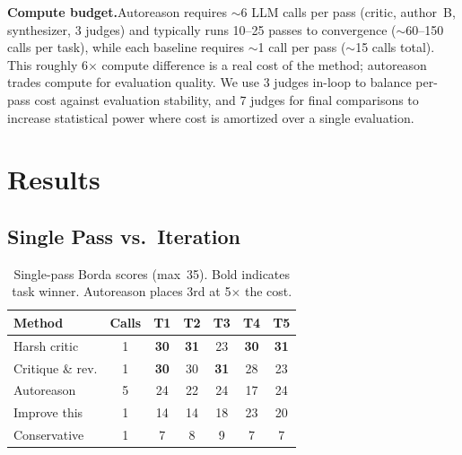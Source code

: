 \documentclass[10pt,twocolumn]{article}
\begin{document}
\textbf{Compute budget.}\enspace Autoreason requires ${\sim}$6 LLM calls per pass (critic, author~B, synthesizer, 3 judges) and typically runs 10--25 passes to convergence (${\sim}$60--150 calls per task), while each baseline requires ${\sim}$1 call per pass (${\sim}$15 calls total). This roughly 6$\times$ compute difference is a real cost of the method; autoreason trades compute for evaluation quality. We use 3 judges in-loop to balance per-pass cost against evaluation stability, and 7 judges for final comparisons to increase statistical power where cost is amortized over a single evaluation.

\section{Results}

\subsection{Single Pass vs.\ Iteration}
\label{sec:v1}

\begin{table}[H]
\centering
\small
\begin{tabular}{@{}lcccccc@{}}
\toprule
\textbf{Method} & \textbf{Calls} & \textbf{T1} & \textbf{T2} & \textbf{T3} & \textbf{T4} & \textbf{T5} \\
\midrule
\rowcolor{TableShade}
Harsh critic & 1 & \textbf{30} & \textbf{31} & 23 & \textbf{30} & \textbf{31} \\
Critique \& rev. & 1 & \textbf{30} & 30 & \textbf{31} & 28 & 23 \\
\rowcolor{TableShade}
Autoreason & 5 & 24 & 22 & 24 & 17 & 24 \\
Improve this & 1 & 14 & 14 & 18 & 23 & 20 \\
\rowcolor{TableShade}
Conservative & 1 & 7 & 8 & 9 & 7 & 7 \\
\bottomrule
\end{tabular}
\caption{Single-pass Borda scores (max~35). Bold indicates task winner. Autoreason places 3rd at 5$\times$ the cost.}
\label{tab:v1}
\end{table}
\end{document}
